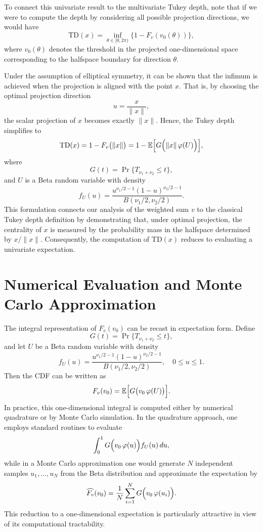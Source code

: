 To connect this univariate result to the multivariate Tukey depth, note that if we were to compute the depth by considering all possible projection directions, we would have
\[
\mathrm{TD}(x)=\inf_{\theta\in[0,2\pi)} \{1-F_v(v_0(\theta))\},
\]
where \(v_0(\theta)\) denotes the threshold in the projected one-dimensional space corresponding to the halfspace boundary for direction \(\theta\).

Under the assumption of elliptical symmetry, it can be shown that the infimum is achieved when the projection is aligned with the point \(x\). That is, by choosing the optimal projection direction
\[
u=\frac{x}{\|x\|},
\]
the scalar projection of \(x\) becomes exactly \(\|x\|\). Hence, the Tukey depth simplifies to
\[
\mathrm{TD}(x)=1-F_v\bigl(\|x\|\bigr)=1-\mathbb{E}\Bigl[G\Bigl(\|x\|\,\varphi(U)\Bigr)\Bigr],
\]
where
\[
G(t)=\Pr\{T_{\nu_1+\nu_2}\le t\},
\]
and \(U\) is a Beta random variable with density
\[
f_U(u)=\frac{u^{\nu_1/2-1}(1-u)^{\nu_2/2-1}}{B(\nu_1/2,\nu_2/2)}.
\]
This formulation connects our analysis of the weighted sum \(v\) to the classical Tukey depth definition by demonstrating that, under optimal projection, the centrality of \(x\) is measured by the probability mass in the halfspace determined by \(x/\|x\|\). Consequently, the computation of \(\mathrm{TD}(x)\) reduces to evaluating a univariate expectation.

\section{Numerical Evaluation and Monte Carlo Approximation}

The integral representation of \(F_v(v_0)\) can be recast in expectation form. Define
\[
G(t)=\Pr\{T_{\nu_1+\nu_2}\le t\},
\]
and let \(U\) be a Beta random variable with density
\[
f_U(u)=\frac{u^{\nu_1/2-1}(1-u)^{\nu_2/2-1}}{B(\nu_1/2,\nu_2/2)}, \quad 0\le u\le 1.
\]
Then the CDF can be written as
\[
F_v(v_0)=\mathbb{E}\Bigl[G\bigl(v_0\,\varphi(U)\bigr)\Bigr].
\]
In practice, this one-dimensional integral is computed either by numerical quadrature or by Monte Carlo simulation. In the quadrature approach, one employs standard routines to evaluate
\[
\int_0^1 G\Bigl(v_0\,\varphi(u)\Bigr)f_U(u)\,du,
\]
while in a Monte Carlo approximation one would generate \(N\) independent samples \(u_1,\ldots,u_N\) from the Beta distribution and approximate the expectation by
\[
\widehat{F_v}(v_0)=\frac{1}{N}\sum_{i=1}^N G\Bigl(v_0\,\varphi(u_i)\Bigr).
\]
This reduction to a one-dimensional expectation is particularly attractive in view of its computational tractability.

